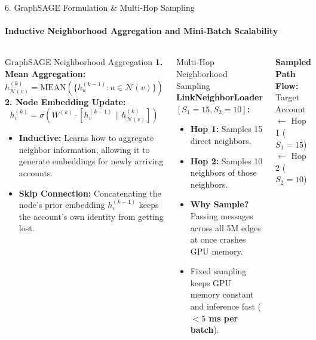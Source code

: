 \documentclass[aspectratio=169, 11pt]{beamer}
\begin{document}
\begin{frame}{6. GraphSAGE Formulation \& Multi-Hop Sampling}
    \framesubtitle{Inductive Neighborhood Aggregation and Mini-Batch Scalability}
    \begin{columns}[T]
        \begin{block}{GraphSAGE Neighborhood Aggregation}
            \scriptsize
            \textbf{1. Mean Aggregation:}
            $$h_{\mathcal{N}(v)}^{(k)} = \text{MEAN}\left(\{h_u^{(k-1)} : u \in \mathcal{N}(v)\}\right)$$
            \textbf{2. Node Embedding Update:}
            $$h_v^{(k)} = \sigma\left(W^{(k)} \cdot \left[ h_v^{(k-1)} \parallel h_{\mathcal{N}(v)}^{(k)} \right]\right)$$
            \begin{itemize}\setlength{\itemsep}{1pt}
                \item \textbf{Inductive:} Learns how to aggregate neighbor information, allowing it to generate embeddings for newly arriving accounts.
                \item \textbf{Skip Connection:} Concatenating the node's prior embedding $h_v^{(k-1)}$ keeps the account's own identity from getting lost.
            \end{itemize}
        \end{block}

        \begin{block}{Multi-Hop Neighborhood Sampling}
            \scriptsize
            \textbf{LinkNeighborLoader $[S_1=15, S_2=10]$:}
            \begin{itemize}\setlength{\itemsep}{1.5pt}
                \item \textbf{Hop 1:} Samples 15 direct neighbors.
                \item \textbf{Hop 2:} Samples 10 neighbors of those neighbors.
                \item \textbf{Why Sample?} Passing messages across all 5M edges at once crashes GPU memory.
                \item Fixed sampling keeps GPU memory constant and inference fast (\textbf{$<5$ ms per batch}).
            \end{itemize}
        \end{block}
        \centering
        \vspace{0.05cm}
        {\tiny \textbf{Sampled Path Flow:} Target Account $\leftarrow$ Hop 1 ($S_1=15$) $\leftarrow$ Hop 2 ($S_2=10$)}
    \end{columns}
\end{frame}
\end{document}
